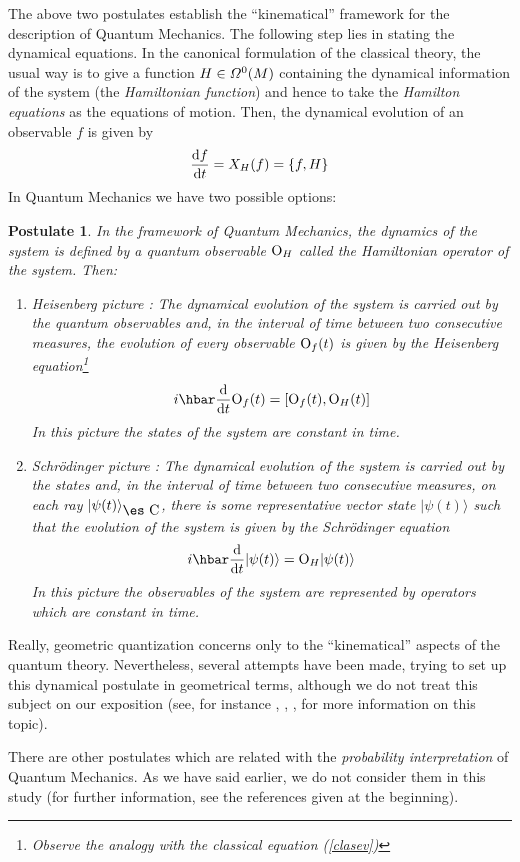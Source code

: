 \documentclass[12pt]{article}
\theoremstyle{plain}
\newtheorem{post}{Postulate}
\def\beq{\begin{equation}}
\def\eeq{\end{equation}}
\def\d{{\rm d}}
\def\Op{{\rm O}}
\def\Complex{\mbox{\es C}}
\begin{document}
The above two postulates establish the ``kinematical'' framework
for the description of Quantum Mechanics.
The following step lies in stating the dynamical equations.
In the canonical formulation of the classical theory,
the usual way is to give a function $H \in {\mit\Omega}^0(M)$
containing the dynamical information of the system
(the {\it Hamiltonian function}) and hence to take the
{\it Hamilton equations} as the equations of motion.
Then, the dynamical evolution of an observable $f$ is given by
\beq
\frac{\d f}{\d t} = X_H(f) = \{ f,H \}
\label{clasev}
\eeq
In Quantum Mechanics we have two possible options:

\begin{post}
In the framework of Quantum Mechanics, the dynamics of the system is
defined
by a quantum observable $\Op_H$ called the
{\it Hamiltonian operator} of the system. Then:
\begin{enumerate}
\item
{\rm Heisenberg picture \/}:
The dynamical evolution of the system is carried out by the quantum
observables and,
in the interval of time between two consecutive measures,
the evolution of every observable $\Op_f(t)$  is given by the
{\rm Heisenberg equation}\footnote{
Observe the analogy with the classical equation
(\ref{clasev})}
$$
i\hbar\frac{\d}{\d t}{\Op_f(t)} = [\Op_f(t),\Op_H(t)]
$$
In this picture the states of the system are constant in time.
\item
{\rm Schr\"odinger picture \/}:
The dynamical evolution of the system is carried out by the states and,
in the interval of time between two consecutive measures, on each ray
$|\psi (t) \rangle_{\Complex}$, there is some representative vector
state
$|\psi (t) \rangle $ such that the evolution of the system is given by
the
{\rm Schr\"{o}dinger equation}
$$
i\hbar\frac{\d}{\d t}|\psi (t) \rangle = \Op_H|\psi (t) \rangle
$$
In this picture the observables of the system are  represented
by operators which are constant in time.
\end{enumerate}
\label{pos5}
\end{post}

Really, geometric quantization concerns only to the ``kinematical''
aspects of the quantum theory. Nevertheless, several
attempts have been made, trying to set up this dynamical postulate in
geometrical terms,
although we do not treat this subject on our exposition
(see, for instance \cite{ACP-82}, \cite{Il-98a}, \cite{Il-98b},
\cite{Tu-85}
for more information on this topic).

There are other postulates which are related with
the {\it probability interpretation} of Quantum Mechanics.
As we have said earlier, we do not consider them in this study
(for further information, see the references given at the beginning).
\end{document}
